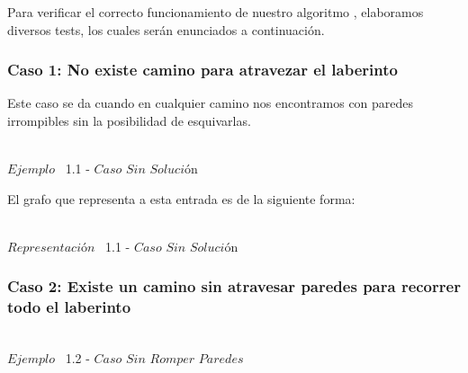 \indent Para verificar el correcto funcionamiento de nuestro algoritmo , elaboramos diversos tests,
los cuales ser\'an enunciados a continuaci\'on.\\

\begin{center}
 \subsubsection*{Caso 1: No existe camino para atravezar el laberinto}
\end{center}

Este caso se da cuando en cualquier camino nos encontramos con paredes irrompibles sin la posibilidad de esquivarlas.\\
 
\vspace*{0.3cm} \vspace*{0.3cm}
  \begin{center}
\\{$Ejemplo$ \ 1.1 - $Caso$ $Sin$ $Soluci$\'on}
  \end{center}
  \vspace*{0.3cm}

El grafo que representa a esta entrada es de la siguiente forma:\\

\vspace*{0.3cm} \vspace*{0.3cm}
  \begin{center}
 \\{$Representación$ \ 1.1 - $Caso$ $Sin$ $Soluci$\'on}
  \end{center}
  \vspace*{0.3cm}


 \begin{center}
 \subsubsection*{Caso 2: Existe un camino sin atravesar paredes para recorrer todo el laberinto}
\end{center}
 
\vspace*{0.3cm} \vspace*{0.3cm}
  \begin{center}
 \\{$Ejemplo$ \ 1.2 - $Caso$ $Sin$ $Romper$ $Paredes$}
  \end{center}
  \vspace*{0.3cm}

